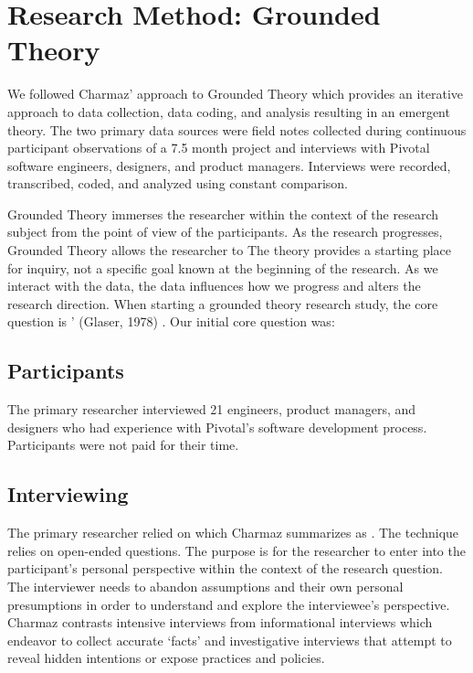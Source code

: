 \section{Research Method: Grounded Theory}
\label{ResearchMethod}

We followed Charmaz' approach to Grounded Theory \cite{Charmaz} which provides an iterative approach to data collection, data coding, and analysis resulting in an emergent theory. The two primary data sources were field notes collected during continuous participant observations of a 7.5 month project and interviews with Pivotal software engineers, designers, and product managers. Interviews were recorded, transcribed, coded, and analyzed using constant comparison. 

Grounded Theory immerses the researcher within the context of the research subject from the point of view of the participants. As the research progresses, Grounded Theory allows the researcher to  The theory provides a starting place for inquiry, not a specific goal known at the beginning of the research. As we interact with the data, the data influences how we progress and alters the research direction. When starting a grounded theory research study, the core question is ' (Glaser, 1978) \cite{GlaserTheoreticalSensitivity}. Our initial core question was: 

\subsection{Participants}
The primary researcher interviewed 21 engineers, product managers, and designers who had experience with Pivotal's software development process. Participants were not paid for their time. 
\subsection{Interviewing}
The primary researcher relied on  which Charmaz summarizes as  \cite{Charmaz}. The technique relies on open-ended questions. The purpose is for the researcher to enter into the participant's personal perspective within the context of the research question. The interviewer needs to abandon assumptions and their own personal presumptions in order to understand and explore the interviewee's perspective. Charmaz \cite{Charmaz} contrasts intensive interviews from informational interviews which endeavor to collect accurate `facts' and investigative interviews that attempt to reveal hidden intentions or expose practices and policies. 
 

